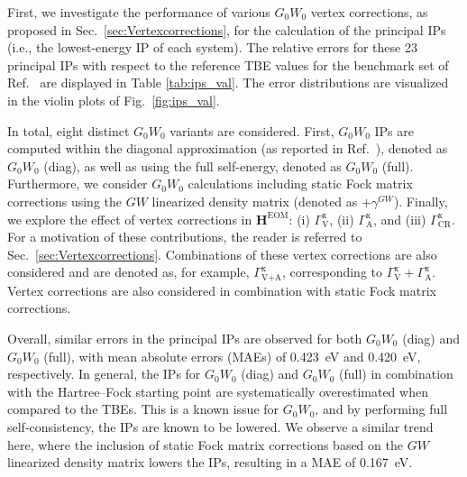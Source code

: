 \documentclass[aip,jcp,reprint,noshowkeys,superscriptaddress]{revtex4-2}
\newcommand{\EOM}{\text{EOM}}
\newcommand{\bH}{\boldsymbol{H}}
\begin{document}
First, we investigate the performance of various $G_0W_0$ vertex corrections, as proposed in Sec.~\ref{sec:Vertexcorrections}, for the calculation of the principal IPs (i.e., the lowest-energy IP of each system).
The relative errors for these 23 principal IPs with respect to the reference TBE values for the benchmark set of Ref.~ are displayed in Table \ref{tab:ips_val}.
The error distributions are visualized in the violin plots of Fig.~\ref{fig:ips_val}.

In total, eight distinct $G_0W_0$ variants are considered.
First, $G_0W_0$ IPs are computed within the diagonal approximation (as reported in Ref.~), denoted as $G_0W_0$ (diag), as well as using the full self-energy, denoted as $G_0W_0$ (full). 
Furthermore, we consider $G_0W_0$ calculations including static Fock matrix corrections using the $GW$ linearized density matrix (denoted as $+\gamma^{GW}$).
Finally, we explore the effect of vertex corrections in $\bH^\EOM$: (i) $\Gamma_\text{V}^\text{x}$, (ii) $\Gamma_\text{A}^\text{x}$, and (iii) $\Gamma_\text{CR}^\text{x}$.
For a motivation of these contributions, the reader is referred to Sec.~\ref{sec:Vertexcorrections}.
Combinations of these vertex corrections are also considered and are denoted as, for example, $\Gamma^{\text{x}}_\text{V+A}$, corresponding to $\Gamma^{\text{x}}_\text{V}+ \Gamma^{\text{x}}_\text{A}$.
Vertex corrections are also considered in combination with static Fock matrix corrections.

Overall, similar errors in the principal IPs are observed for both $G_0W_0$ (diag) and $G_0W_0$ (full), with mean absolute errors 
(MAEs) of \SI{0.423}{\eV} and \SI{0.420}{\eV}, respectively.
In general, the IPs for $G_0W_0$ (diag) and $G_0W_0$ (full) in combination with the Hartree--Fock starting point are systematically overestimated when compared to the TBEs.
This is a known issue for $G_0W_0$, \cite{Stan_2006,Caruso_2012,Caruso_2013a,Caruso_2016,Maggio_2016,Wen_2024} and by performing full self-consistency, the IPs are known to be lowered. \cite{Stan_2006,Caruso_2012,Caruso_2013a,Caruso_2016,Wen_2024}
We observe a similar trend here, where the inclusion of static Fock matrix corrections based on the $GW$ linearized density matrix lowers the IPs, resulting in a MAE of \SI{0.167}{\eV}.
\end{document}
